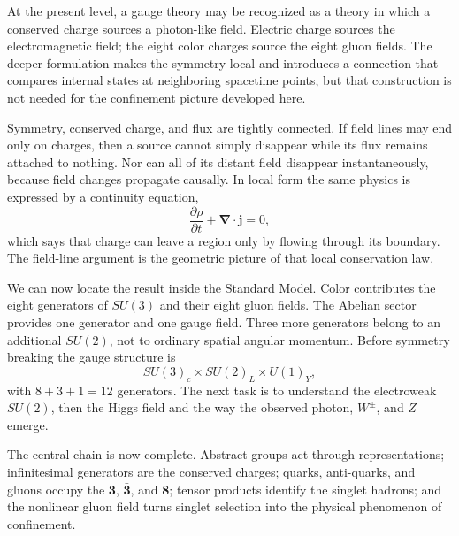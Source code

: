 At the present level, a gauge theory may be recognized as a theory in which a
conserved charge sources a photon-like field. Electric charge sources the
electromagnetic field; the eight color charges source the eight gluon fields.
The deeper formulation makes the symmetry local and introduces a connection
that compares internal states at neighboring spacetime points, but that
construction is not needed for the confinement picture developed here.

Symmetry, conserved charge, and flux are tightly connected. If field lines may
end only on charges, then a source cannot simply disappear while its flux
remains attached to nothing. Nor can all of its distant field disappear
instantaneously, because field changes propagate causally. In local form the
same physics is expressed by a continuity equation,
\begin{equation}
\frac{\partial\rho}{\partial t}
+\boldsymbol\nabla\cdot\boldsymbol j=0,
\end{equation}
which says that charge can leave a region only by flowing through its boundary.
The field-line argument is the geometric picture of that local conservation
law.

We can now locate the result inside the Standard Model. Color contributes the
eight generators of \(SU(3)\) and their eight gluon fields. The Abelian sector
provides one generator and one gauge field. Three more generators belong to an
additional \(SU(2)\), not to ordinary spatial angular momentum. Before symmetry
breaking the gauge structure is
\begin{equation}
SU(3)_c\times SU(2)_L\times U(1)_Y,
\end{equation}
with \(8+3+1=12\) generators. The next task is to understand the electroweak
\(SU(2)\), then the Higgs field and the way the observed photon, \(W^\pm\), and
\(Z\) emerge.

The central chain is now complete. Abstract groups act through
representations; infinitesimal generators are the conserved charges; quarks,
anti-quarks, and gluons occupy the \(\boldsymbol 3\),
\(\bar{\boldsymbol 3}\), and \(\boldsymbol 8\); tensor products identify the
singlet hadrons; and the nonlinear gluon field turns singlet selection into
the physical phenomenon of confinement.
